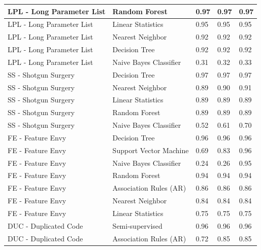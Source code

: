 \begin{small}
\begin{longtable} {|l|l|l|l|l|}
LPL - Long Parameter List    & Random Forest          & 0.97  & 0.97   & 0.97  \\ \hline
LPL - Long Parameter List    & Linear Statistics      & 0.95  & 0.95   & 0.95  \\ \hline
LPL - Long Parameter List    & Nearest Neighbor       & 0.92  & 0.92   & 0.92  \\ \hline
LPL - Long Parameter List    & Decision Tree          & 0.92  & 0.92   & 0.92  \\ \hline
LPL - Long Parameter List    & Naive Bayes Classifier & 0.31  & 0.32   & 0.33  \\ \hline\hline

SS - Shotgun Surgery         & Decision Tree          & 0.97  & 0.97   & 0.97  \\ \hline
SS - Shotgun Surgery         & Nearest Neighbor       & 0.89  & 0.90   & 0.91  \\ \hline
SS - Shotgun Surgery         & Linear Statistics      & 0.89  & 0.89   & 0.89  \\ \hline
SS - Shotgun Surgery         & Random Forest          & 0.89  & 0.89   & 0.89  \\ \hline
SS - Shotgun Surgery         & Naive Bayes Classifier & 0.52  & 0.61   & 0.70  \\ \hline\hline

FE - Feature Envy            & Decision Tree          & 0.96  & 0.96   & 0.96  \\ \hline
FE - Feature Envy            & Support Vector Machine & 0.69  & 0.83   & 0.96  \\ \hline
FE - Feature Envy            & Naive Bayes Classifier & 0.24  & 0.26   & 0.95  \\ \hline
FE - Feature Envy            & Random Forest          & 0.94  & 0.94   & 0.94  \\ \hline
FE - Feature Envy            & Association Rules (AR) & 0.86  & 0.86   & 0.86  \\ \hline
FE - Feature Envy            & Nearest Neighbor       & 0.84  & 0.84   & 0.84  \\ \hline
FE - Feature Envy            & Linear Statistics      & 0.75  & 0.75   & 0.75  \\ \hline\hline

DUC - Duplicated Code        & Semi-supervised        & 0.96  & 0.96   & 0.96  \\ \hline
DUC - Duplicated Code        & Association Rules (AR) & 0.72  & 0.85   & 0.85  \\ \hline\hline


\end{longtable}
\end{small}
